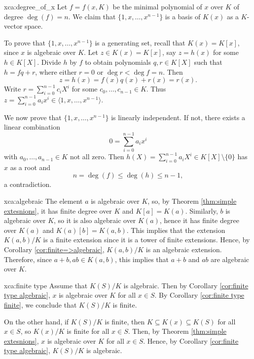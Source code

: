 \begin{sol}{xca:degree_of_x}
    Let $f=f(x,K)$ be the minimal polynomial of $x$ over $K$ of degree $\deg(f)=n$.
    We claim that $\{1,x,\dots, x^{n-1}\}$ is a basis of $K(x)$ as a $K$-vector space. 

    To prove that $\{1,x,\dots, x^{n-1}\}$ is a generating set, recall that $K(x)=K[x]$, since $x$ is algebraic over $K$. 
    Let $z\in K(x)=K[x]$, say $z=h(x)$ for some $h\in K[X]$. 
    Divide $h$ by $f$ to obtain polynomials $q,r\in K[X]$ 
    such that $h=fq+r$, where either $r=0$ or $\deg r<\deg f=n$. Then 
    \[
		z=h(x)=f(x)q(x)+r(x)=r(x).
	\]
	Write $r=\sum_{i=0}^{n-1}c_iX^i$ for some $c_0,\dots,c_{n-1}\in K$. 
    Thus $z=\sum_{i=0}^{n-1}a_ix^i\in \langle 1,x,\dots,x^{n-1}\rangle$.
        
    We now prove that $\{1,x,\dots, x^{n-1}\}$ is linearly independent. If not, 
    there exists a linear combination
    \[
    0=\sum_{i=0}^{n-1}a_ix^i
    \]
    with $a_0,\dots,a_{n-1}\in K$ not all zero. 
    Then $h(X)=\sum_{i=0}^{n-1}a_iX^i\in K[X]\setminus\{0\}$
    has $x$ as a root and 
        \[
        n=\deg(f)\leq \deg(h)\leq n-1,
        \]
       a contradiction. 
\end{sol}

\begin{sol}{xca:algebraic}
The element $a$ is algebraic over $K$, 
so, by Theorem \ref{thm:simple extesnions},
it has finite degree over $K$
and $K[a]=K(a)$.
Similarly, $b$ is algebraic over $K$,
so it is also algebraic over $K(a)$, hence it has finite degree over $K(a)$ and 
$K(a)[b]=K(a,b)$.
This implies that the extension
$K(a,b)/K$ is a finite extension
since it is a tower of finite extensions.
Hence, by Corollary \ref{cor:finite=>algebraic}, $K(a,b)/K$ is an algebraic extension.
Therefore, since $a+b,ab\in K(a,b)$,
this implies that $a+b$ and $ab$
are algebraic over $K$.
\end{sol}

\begin{sol}{xca:finite type}
    Assume that $K(S)/K$ is algebraic. Then by Corollary \ref{cor:finite type algebraic}, 
    $x$ is algebraic over $K$ for all $x\in S$.
    By Corollary \ref{cor:finite type finite}, we conclude that $K(S)/K$ is finite.

    On the other hand, if $K(S)/K$ is finite, then
    $K\subseteq K(x)\subseteq K(S)$ for all $x\in S$, so
    $K(x)/K$ is finite for all $x\in S$.
    Then, by Theorem \ref{thm:simple extesnions},
    $x$ is algebraic over $K$ for all $x\in S$.
    Hence, by Corollary \ref{cor:finite type algebraic}, $K(S)/K$ is algebraic.
 \end{sol}

